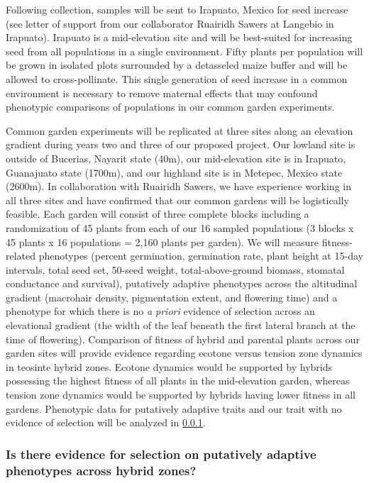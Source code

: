 Following collection, samples will be sent to Irapuato, Mexico for seed increase (see letter of support from our collaborator Ruairidh Sawers at Langebio in Irapuato).
Irapuato is a mid-elevation site and will be best-suited for increasing seed from all populations in a single environment.
Fifty plants per population will be grown in isolated plots surrounded by a detasseled maize  buffer and will be allowed to cross-pollinate.
This single generation of seed increase in a common environment is necessary to remove maternal effects that may confound phenotypic comparisons of populations in our common garden experiments.

Common garden experiments will be replicated at three sites along an elevation gradient during years two and three of our proposed project.
Our lowland site is outside of Bucerias, Nayarit state (40m), our mid-elevation site is in Irapuato, Guanajuato state (1700m), and our highland site is in Metepec, Mexico state (2600m).
In collaboration with Ruairidh Sawers, we have experience working in all three sites and have confirmed that our common gardens will be logistically feasible.
Each garden will consist of three complete blocks including a randomization of 45 plants from each of our 16 sampled populations (3 blocks x 45 plants x 16 populations = 2,160 plants per garden).  
We will measure fitness-related phenotypes (percent germination, germination rate, plant height at 15-day intervals, total seed set, 50-seed weight, total-above-ground biomass, stomatal conductance and survival), putatively adaptive phenotypes across the altitudinal gradient (macrohair density, pigmentation extent, and flowering time) and a phenotype for which there is no \emph{a priori} evidence of selection across an elevational gradient (the width of the leaf beneath the first lateral branch at the time of flowering).  
Comparison of fitness of hybrid and parental plants across our garden sites will provide evidence regarding ecotone versus tension zone dynamics in teosinte hybrid zones.  Ecotone dynamics would be supported by hybrids possessing the highest fitness of all plants in the mid-elevation garden, whereas tension zone dynamics would be supported by hybrids having lower fitness in all gardens.  Phenotypic data for putatively adaptive traits and our trait with no evidence of selection will be analyzed in \ref{sss:driftsel}.   

\subsubsection{Is there evidence for selection on putatively adaptive phenotypes across hybrid zones?}
\label{sss:driftsel}

